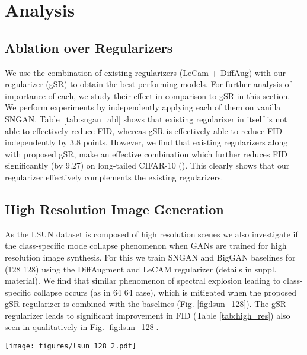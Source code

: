 \documentclass[runningheads,table]{llncs}
\begin{document}
\section{Analysis}
\subsection{Ablation over Regularizers}
We use the combination of existing regularizers (LeCam + DiffAug) with our regularizer (gSR) to obtain the best performing models. For further analysis of importance of each, we study their effect in comparison to gSR in this section. We perform experiments by independently applying each of them on vanilla SNGAN. Table~\ref{tab:sngan_abl} shows that existing regularizer in itself is not able to effectively reduce FID, whereas gSR is effectively able to reduce FID independently by 3.8 points. However, we find that existing regularizers along with proposed gSR, make an effective combination which further reduces FID significantly (by 9.27) on long-tailed CIFAR-10 (). This clearly shows that our regularizer effectively complements the existing regularizers.
\subsection{High Resolution Image Generation} 
As the LSUN dataset is composed of high resolution scenes we also investigate if the class-specific mode collapse phenomenon when GANs are trained for high resolution image synthesis. For this we train SNGAN and BigGAN baselines for (128  128) using the DiffAugment and LeCAM regularizer (details in suppl. material). We find that similar phenomenon of spectral explosion leading to class-specific collapse occurs (as in 64  64 case), which is mitigated when the proposed gSR regularizer is combined with the baselines (Fig. \ref{fig:lsun_128}). The gSR regularizer leads to significant improvement in FID (Table \ref{tab:high_res}) also seen in qualitatively in Fig. \ref{fig:lsun_128}.
\begin{figure*}[t]    
    \centering
    \texttt{[image: figures/lsun\_128\_2.pdf]}
    \caption{\textbf{Qualitative comparison of BigGAN variants on LSUN dataset (=100) (128  128).} Each row represents images from a distinct class. }
    \label{fig:lsun_128}
\end{figure*}
\end{document}
